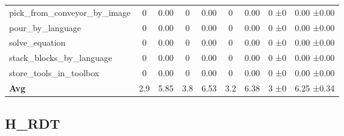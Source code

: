 \begin{table}[H]
{\begin{tabular}{l|c|c|c|c|c|c|c|c}
pick\_from\_conveyor\_by\_image & 0 & 0.00 & 0 & 0.00 & 0 & 0.00 & 0 ±0 & 0.00 ±0.00 \\
pour\_by\_language & 0 & 0.00 & 0 & 0.00 & 0 & 0.00 & 0 ±0 & 0.00 ±0.00 \\
solve\_equation & 0 & 0.00 & 0 & 0.00 & 0 & 0.00 & 0 ±0 & 0.00 ±0.00 \\
stack\_blocks\_by\_language & 0 & 0.00 & 0 & 0.00 & 0 & 0.00 & 0 ±0 & 0.00 ±0.00 \\
store\_tools\_in\_toolbox & 0 & 0.00 & 0 & 0.00 & 0 & 0.00 & 0 ±0 & 0.00 ±0.00 \\
\hline
\textbf{Avg} & 2.9 & 5.85 & 3.8 & 6.53 & 3.2 & 6.38 & 3 ±0 & 6.25 ±0.34 \\
\hline
\end{tabular}
}
\end{table}
\subsection{H\_RDT}
\label{part:h_rdt}

